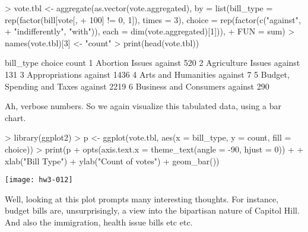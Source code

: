 \documentclass{article}
\begin{document}
\begin{enumerate}[(a)]
\begin{Schunk}
\begin{Sinput}
> vote.tbl <- aggregate(as.vector(vote.aggregated), by = list(bill_type = rep(factor(bill[vote[, 
+     100] != 0, 1]), times = 3), choice = rep(factor(c("against", 
+     "indifferently", "with")), each = dim(vote.aggregated)[1])), 
+     FUN = sum)
> names(vote.tbl)[3] <- "count"
> print(head(vote.tbl))
\end{Sinput}
\begin{Soutput}
                   bill_type  choice count
1            Abortion Issues against   520
2         Agriculture Issues against   131
3             Appropriations against  1436
4        Arts and Humanities against     7
5 Budget, Spending and Taxes against  2219
6     Business and Consumers against   290
\end{Soutput}
\end{Schunk}

    Ah, verbose numbers. So we again visualize this tabulated data, using a bar chart.
\begin{Schunk}
\begin{Sinput}
> library(ggplot2)
> p <- ggplot(vote.tbl, aes(x = bill_type, y = count, fill = choice))
> print(p + opts(axis.text.x = theme_text(angle = -90, hjust = 0)) + 
+     xlab("Bill Type") + ylab("Count of votes") + geom_bar())
\end{Sinput}
\end{Schunk}
\texttt{[image: hw3-012]}

    Well, looking at this plot prompts many interesting thoughts.
    For instance, budget bills are, unsurprisingly, a view into the bipartisan nature of Capitol Hill.
    And also the immigration, health issue bills etc etc.
    \end{enumerate}

    
\end{document}
